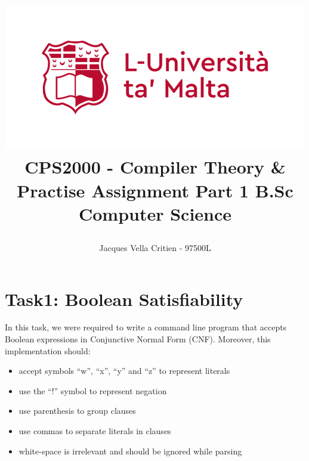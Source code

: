\documentclass{article}
\newcommand{\quotes}[1]{``#1''}
\begin{document}
			\title{\includegraphics[scale = .6]{uom.png}
				\linebreak 
				\textbf{CPS2000 - Compiler Theory \& Practise}\linebreak\linebreak
				\textbf{Assignment Part 1}\linebreak\linebreak
				\large{B.Sc Computer Science}
				\date{}
				\author{Jacques Vella Critien - 97500L}}
				
				\begin{titlepage}
					\maketitle
					\thispagestyle{empty}
				\end{titlepage}
				
				\tableofcontents
				\newpage
				
				\section{Task1: Boolean Satisfiability}
				
				In this task, we were required to write a command line program that accepts Boolean expressions in Conjunctive Normal Form (CNF). Moreover, this implementation should:
				
				\begin{itemize}
				\item accept symbols \quotes{w}, \quotes{x}, \quotes{y} and \quotes{z} to represent literals
				\item use the \quotes{!} symbol to represent negation
				\item use parenthesis to group clauses
				\item use commas	to	separate literals	in	clauses
				\item white-space is irrelevant and should be ignored while parsing
				\end{itemize} 
				
\end{document}
